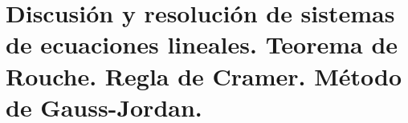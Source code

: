 \chapter{Discusión y resolución de sistemas de ecuaciones lineales. Teorema de Rouche. Regla de Cramer. Método de Gauss-Jordan.}